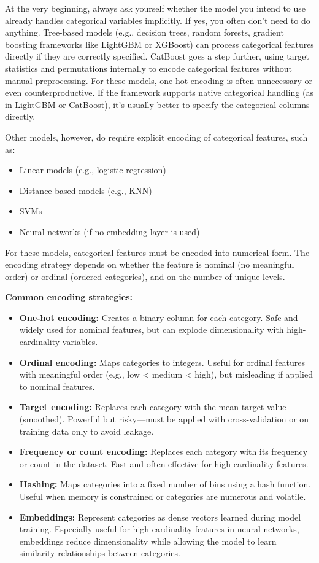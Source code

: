 \documentclass[12pt,openany]{book}
\begin{document}
At the very beginning, always ask yourself whether the model you intend to use already handles categorical variables implicitly. If yes, you often don’t need to do anything. Tree-based models (e.g., decision trees, random forests, gradient boosting frameworks like LightGBM or XGBoost) can process categorical features directly if they are correctly specified. CatBoost goes a step further, using target statistics and permutations internally to encode categorical features without manual preprocessing. For these models, one-hot encoding is often unnecessary or even counterproductive. If the framework supports native categorical handling (as in LightGBM or CatBoost), it’s usually better to specify the categorical columns directly. \newline

Other models, however, do require explicit encoding of categorical features, such as:
\begin{itemize}
    \item Linear models (e.g., logistic regression)
    \item Distance-based models (e.g., KNN)
    \item SVMs
    \item Neural networks (if no embedding layer is used)
\end{itemize}
\newline

For these models, categorical features must be encoded into numerical form. The encoding strategy depends on whether the feature is nominal (no meaningful order) or ordinal (ordered categories), and on the number of unique levels. \newline

\textbf{Common encoding strategies:}
\begin{itemize}
    \item \textbf{One-hot encoding:} Creates a binary column for each category. Safe and widely used for nominal features, but can explode dimensionality with high-cardinality variables.
    \item \textbf{Ordinal encoding:} Maps categories to integers. Useful for ordinal features with meaningful order (e.g., low < medium < high), but misleading if applied to nominal features.
    \item \textbf{Target encoding:} Replaces each category with the mean target value (smoothed). Powerful but risky—must be applied with cross-validation or on training data only to avoid leakage.
    \item \textbf{Frequency or count encoding:} Replaces each category with its frequency or count in the dataset. Fast and often effective for high-cardinality features.
    \item \textbf{Hashing:} Maps categories into a fixed number of bins using a hash function. Useful when memory is constrained or categories are numerous and volatile.
    \item \textbf{Embeddings:} Represent categories as dense vectors learned during model training. Especially useful for high-cardinality features in neural networks, embeddings reduce dimensionality while allowing the model to learn similarity relationships between categories.
\end{itemize}
\end{document}
